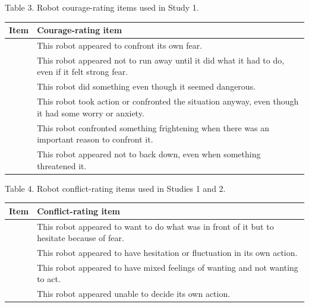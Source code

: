 \documentclass[
]{article}
\newcounter{none} %
\begin{document}
Table 3. Robot courage-rating items used in Study 1.

{\def\LTcaptype{none} %
\begin{longtable}[]{@{}
  >{\raggedright\arraybackslash}p{}
  >{\raggedright\arraybackslash}p{}@{}}
\toprule\noalign{}
\begin{minipage}[b]{\linewidth}\raggedright
Item
\end{minipage} & \begin{minipage}[b]{\linewidth}\raggedright
Courage-rating item
\end{minipage} \\
\midrule\noalign{}
\endhead
\bottomrule\noalign{}
\endlastfoot
1 & This robot appeared to confront its own fear. \\
2 & This robot appeared not to run away until it did what it had to do,
even if it felt strong fear. \\
3 & This robot did something even though it seemed dangerous. \\
4 & This robot took action or confronted the situation anyway, even
though it had some worry or anxiety. \\
5 & This robot confronted something frightening when there was an
important reason to confront it. \\
6 & This robot appeared not to back down, even when something threatened
it. \\
\end{longtable}
}

Table 4. Robot conflict-rating items used in Studies 1 and 2.

{\def\LTcaptype{none} %
\begin{longtable}[]{@{}
  >{\raggedright\arraybackslash}p{}
  >{\raggedright\arraybackslash}p{}@{}}
\toprule\noalign{}
\begin{minipage}[b]{\linewidth}\raggedright
Item
\end{minipage} & \begin{minipage}[b]{\linewidth}\raggedright
Conflict-rating item
\end{minipage} \\
\midrule\noalign{}
\endhead
\bottomrule\noalign{}
\endlastfoot
1 & This robot appeared to want to do what was in front of it but to
hesitate because of fear. \\
2 & This robot appeared to have hesitation or fluctuation in its own
action. \\
3 & This robot appeared to have mixed feelings of wanting and not
wanting to act. \\
4 & This robot appeared unable to decide its own action. \\
\end{longtable}
}
\end{document}
